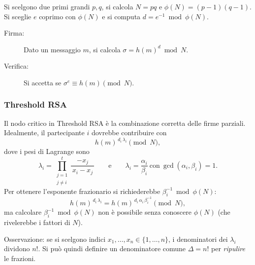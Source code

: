 \documentclass[a4paper, 11pt]{article}
\begin{document}
Si scelgono due primi grandi $p,q$, si calcola $N=pq$ e $\phi(N)=(p-1)(q-1)$. Si sceglie $e$ coprimo con $\phi(N)$ e si computa $d=e^{-1}\bmod\phi(N)$.

\begin{description}
    \item[Firma:] Dato un messaggio $m$, si calcola $\sigma=h(m)^d \bmod N$.
    \item[Verifica:] Si accetta se $\sigma^e \equiv h(m) \pmod N$.
\end{description}

\subsubsection{Threshold RSA}

Il nodo critico in Threshold RSA è la combinazione corretta delle firme parziali. Idealmente, il partecipante $i$ dovrebbe contribuire con
\[
    h(m)^{\,d_i\,\lambda_i} \pmod N,
\]
dove i pesi di Lagrange sono
\[
    \lambda_i=\prod_{\substack{j=1\\ j\neq i}}^{t}\frac{-x_j}{\,x_i-x_j\,}
    \qquad\text{e}\qquad
    \lambda_i=\frac{\alpha_i}{\beta_i}\ \text{con}\ \gcd(\alpha_i,\beta_i)=1.
\]
Per ottenere l'esponente frazionario si richiederebbe $\beta_i^{-1}\bmod\phi(N)$:
\[
    h(m)^{\,d_i\,\lambda_i}=h(m)^{\,d_i\,\alpha_i\,\beta_i^{-1}}\pmod N,
\]
ma calcolare $\beta_i^{-1}\bmod\phi(N)$ non è possibile senza conoscere $\phi(N)$ (che rivelerebbe i fattori di $N$). 

Osservazione: se si scelgono indici $x_1,\dots,x_n\in\{1,\dots,n\}$, i denominatori dei $\lambda_i$ dividono $n!$. Si può quindi definire un denominatore comune $\Delta=n!$ per \textit{ripulire} le frazioni.
\end{document}
